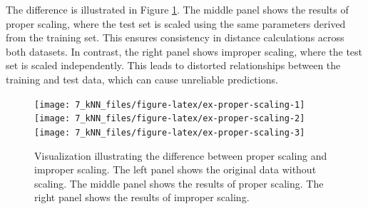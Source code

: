 \documentclass[
  11pt,
]{book}
\makeatletter
\newenvironment{Shaded}{}{}
\newcommand{\AttributeTok}[1]{#1}
\newcommand{\CommentTok}[1]{\textcolor[rgb]{0.36,0.36,0.36}{#1}}
\newcommand{\FunctionTok}[1]{#1}
\newcommand{\NormalTok}[1]{#1}
\newcommand{\OtherTok}[1]{\textcolor[rgb]{0.39,0.39,0.39}{#1}}
\newcommand{\SpecialCharTok}[1]{\textcolor[rgb]{0.39,0.39,0.39}{#1}}
\newcommand{\StringTok}[1]{\textcolor[rgb]{0.39,0.39,0.39}{#1}}
\newenvironment{kframe}{%
\medskip{}
\setlength{\fboxsep}{.8em}
 \def\at@end@of@kframe{}%
 \ifinner\ifhmode%
  \def\at@end@of@kframe{\end{minipage}}%
  \begin{minipage}{\columnwidth}%
 \fi\fi%
 \def\FrameCommand##1{\hskip\@totalleftmargin \hskip-\fboxsep
 \colorbox{shadecolor}{##1}\hskip-\fboxsep
     \hskip-\linewidth \hskip-\@totalleftmargin \hskip\columnwidth}%
 \MakeFramed {\advance\hsize-\width
   \@totalleftmargin\z@ \linewidth\hsize
   \@setminipage}}%
 {\par\unskip\endMakeFramed%
 \at@end@of@kframe}
\renewenvironment{Shaded}{\begin{kframe}}{\end{kframe}}
\theoremstyle{definition}
\theoremstyle{definition}
\theoremstyle{definition}
\theoremstyle{definition}
\theoremstyle{remark}
\makeatother
\begin{document}
\begin{Shaded}
\end{Shaded}

The difference is illustrated in Figure \ref{fig:ex-proper-scaling}. The middle panel shows the results of proper scaling, where the test set is scaled using the same parameters derived from the training set. This ensures consistency in distance calculations across both datasets. In contrast, the right panel shows improper scaling, where the test set is scaled independently. This leads to distorted relationships between the training and test data, which can cause unreliable predictions.

\begin{figure}[H]

{\centering \texttt{[image: 7\_kNN\_files/figure-latex/ex-proper-scaling-1]} \texttt{[image: 7\_kNN\_files/figure-latex/ex-proper-scaling-2]} \texttt{[image: 7\_kNN\_files/figure-latex/ex-proper-scaling-3]} 

}

\caption{Visualization illustrating the difference between proper scaling and improper scaling. The left panel shows the original data without scaling. The middle panel shows the results of proper scaling. The right panel shows the results of improper scaling.}\label{fig:ex-proper-scaling}
\end{figure}
\end{document}
